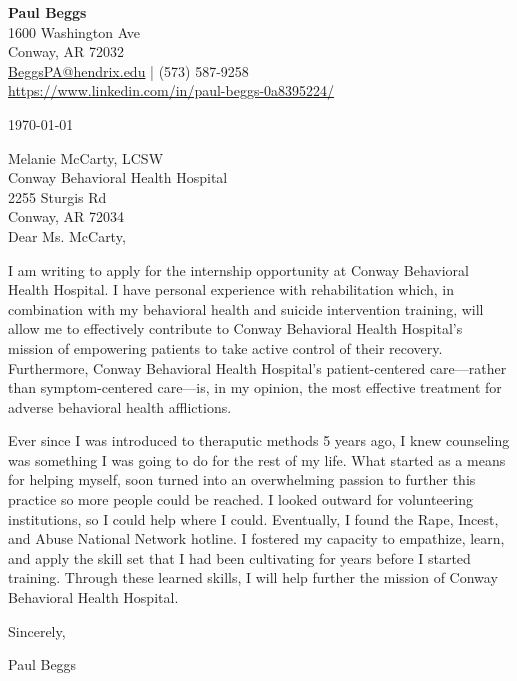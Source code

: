 \documentclass[11pt,letterpaper]{article}
\begin{document}
\begin{center}
    \LARGE \textbf{Paul Beggs} \\
    \vspace{0.2cm}
    \normalsize
    1600 Washington Ave \\
    Conway, AR 72032 \\
    \href{mailto:BeggsPA@hendrix.edu}{BeggsPA@hendrix.edu} | (573) 587-9258 \\
    \url{https://www.linkedin.com/in/paul-beggs-0a8395224/}
\end{center}

\vspace{0.25cm}
\singlespacing




\today

Melanie McCarty, LCSW \\
Conway Behavioral Health Hospital \\
2255 Sturgis Rd \\
Conway, AR 72034 \\

Dear Ms. McCarty,


I am writing to apply for the internship opportunity at Conway Behavioral Health Hospital. I have personal experience with rehabilitation which, in combination with my behavioral health and suicide intervention training, will allow me to effectively contribute to Conway Behavioral Health Hospital's mission of empowering patients to take active control of their recovery. Furthermore, Conway Behavioral Health Hospital's patient-centered care---rather than symptom-centered care---is, in my opinion, the most effective treatment for adverse behavioral health afflictions.



Ever since I was introduced to theraputic methods 5 years ago, I knew counseling was something I was going to do for the rest of my life. What started as a means for helping myself, soon turned into an overwhelming passion to further this practice so more people could be reached. I looked outward for volunteering institutions, so I could help where I could. Eventually, I found the Rape, Incest, and Abuse National Network hotline. I fostered my capacity to empathize, learn, and apply the skill set that I had been cultivating for years before I started training. Through these learned skills, I will help further the mission of Conway Behavioral Health Hospital.







Sincerely, \\

\vspace*{1cm}

Paul Beggs
\end{document}
